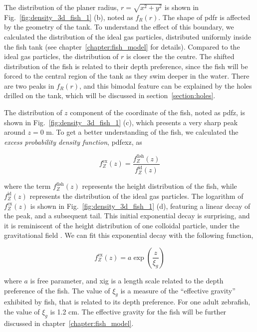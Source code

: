 \documentclass[11pt,twoside]{report}
\begin{document}
The distribution of the planer radius, $r=\sqrt{x^2 + y^2}$ is shown in Fig.~\ref{fig:density_3d_fish_1} (b), noted as $f_R(r)$. The shape of \gls{pdfr} is affected by the geometry of the tank. To understand the effect of this boundary, we calculated the distribution of the ideal gas particles, distributed uniformly inside the fish tank (see chapter~\ref{chapter:fish_model} for details). Compared to the ideal gas particles, the distribution of $r$ is closer the the centre. The shifted distribution of the fish is related to their depth preference, since the fish will be forced to the central region of the tank as they swim deeper in the water.
There are two peaks in $f_R(r)$, and this bimodal feature can be explained by the holes drilled on the tank, which will be discussed in section~\ref{section:holes}.

The distribution of $z$ component of the coordinate of the fish, noted as \gls{pdfz}, is shown in Fig.~\ref{fig:density_3d_fish_1} (c), which presents a very sharp peak around $z = 0$ m.
To get a better understanding of the fish, we calculated the \emph{excess probability density function}, \gls{pdfexz}, as

\begin{equation}
	f_Z^\mathrm{ex}(z) = \frac{f_Z^\mathrm{fish}(z)}{f_Z^\mathrm{id}(z)}
\label{eq:dist_excess}
\end{equation}

\noindent where the term $f_Z^\mathrm{fish}(z)$ represents the height distribution of the fish, while $f_Z^\mathrm{id}(z)$ represents the distribution of the ideal gas particles. The logarithm of $f_Z^\mathrm{ex}(z)$ is shown in Fig.~\ref{fig:density_3d_fish_1} (d), featuring a linear decay of the peak, and a subsequent tail.
This initial exponential decay is surprising, and it is reminiscent of the height distribution of one colloidal particle, under the gravitational field \cite{biben1993, royall2007prl}.  
We can fit this exponential decay with the following function,

\begin{equation*}
f_Z^\mathrm{ex}(z) = a \exp\left( \frac{z}{\xi_g} \right)
\end{equation*}

\noindent where $a$ is free parameter, and \gls{xig} is a length scale related to the depth preference of the fish. The value of $\xi_g$ is a measure of the ``effective gravity'' exhibited by fish, that is related to its depth preference. For one adult zebrafish, the value of $\xi_g$ is 1.2 cm. The effective gravity for the fish will be further discussed in chapter~\ref{chapter:fish_model}.
\end{document}
